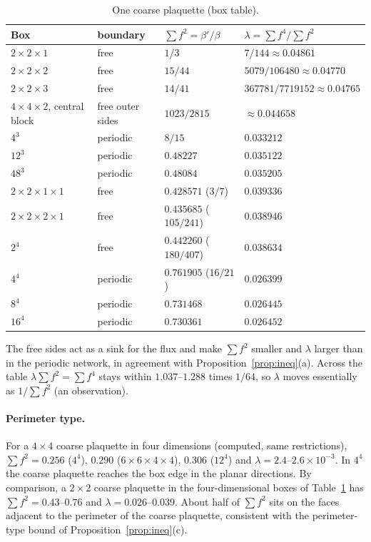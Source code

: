 \documentclass[11pt,a4paper]{article}
\theoremstyle{definition}
\theoremstyle{remark}
\begin{document}
\begin{table}[h]\centering\small
\caption{One coarse plaquette (box table).}\label{tab:box}
\begin{tabular}{@{}llll@{}}
\toprule
Box & boundary & $\sum f^2=\beta'/\beta$ & $\lambda=\sum f^4/\sum f^2$\\ \midrule
$2\times2\times1$ & free & $1/3$ & $7/144\approx0.04861$\\
$2\times2\times2$ & free & $15/44$ & $5079/106480\approx0.04770$\\
$2\times2\times3$ & free & $14/41$ & $367781/7719152\approx0.04765$\\
$4\times4\times2$, central block & free outer sides & $1023/2815$ & $\approx0.044658$\\
$4^3$ & periodic & $8/15$ & $0.033212$\\
$12^3$ & periodic & $0.48227$ & $0.035122$\\
$48^3$ & periodic & $0.48084$ & $0.035205$\\ \midrule
$2\times2\times1\times1$ & free & $0.428571$ ($3/7$) & $0.039336$\\
$2\times2\times2\times1$ & free & $0.435685$ ($105/241$) & $0.038946$\\
$2^4$ & free & $0.442260$ ($180/407$) & $0.038634$\\
$4^4$ & periodic & $0.761905$ ($16/21$) & $0.026399$\\
$8^4$ & periodic & $0.731468$ & $0.026445$\\
$16^4$ & periodic & $0.730361$ & $0.026452$\\
\bottomrule
\end{tabular}
\end{table}

The free sides act as a sink for the flux and make $\sum f^2$ smaller and $\lambda$ larger than in the periodic network, in agreement with Proposition~\ref{prop:ineq}(a). Across the table $\lambda\sum f^2=\sum f^4$ stays within $1.037$--$1.288$ times $1/64$, so $\lambda$ moves essentially as $1/\sum f^2$ (an observation).

\paragraph{Perimeter type.}
For a $4\times4$ coarse plaquette in four dimensions (computed, same restrictions), $\sum f^2=0.256$ ($4^4$), $0.290$ ($6\times6\times4\times4$), $0.306$ ($12^4$) and $\lambda=2.4$--$2.6\times10^{-3}$. In $4^4$ the coarse plaquette reaches the box edge in the planar directions. By comparison, a $2\times2$ coarse plaquette in the four-dimensional boxes of Table~\ref{tab:box} has $\sum f^2=0.43$--$0.76$ and $\lambda=0.026$--$0.039$. About half of $\sum f^2$ sits on the faces adjacent to the perimeter of the coarse plaquette, consistent with the perimeter-type bound of Proposition~\ref{prop:ineq}(c).
\end{document}
